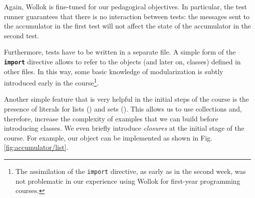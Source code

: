 Again, Wollok is fine-tuned for our pedagogical objectives.
In particular, the test runner guarantees that there is no interaction between tests: the messages sent to the accumulator in the first test will not affect the state of the accumulator in the second test.

Furthermore, tests have to be written in a separate file.
A simple form of the \texttt{\textbf{import}} directive allows to refer to the objects (and later on, classes) defined in other files.
In this way, some basic knowledge of modularization is subtly introduced early in the course\footnote{The assimilation of the \texttt{import} directive, as early as in the second week, was not problematic in our experience using Wollok for first-year programming courses.}.


\medskip
Another simple feature that is very helpful in the initial steps of the course is the presence of literals for lists (\eg \code{[1,2,3]}) and sets (\eg {}).
This allows us to use collections and, therefore, increase the complexity of examples that we can build before introducing classes.
We even briefly introduce \emph{closures} at the initial stage of the course.
For example, our  object can be implemented as shown in Fig. \ref{fig:accumulator/list}.

